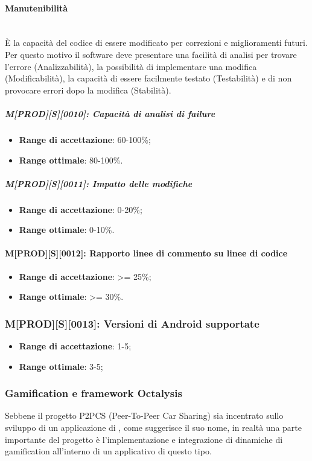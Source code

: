 \paragraph{Manutenibilità}
~\\
È la capacità del codice di essere modificato per correzioni e miglioramenti futuri. Per questo motivo il software deve presentare una facilità di analisi per trovare l'errore (Analizzabilità), la possibilità di implementare una modifica (Modificabilità), la capacità di essere facilmente testato (Testabilità) e di non provocare errori dopo la modifica (Stabilità).
\subparagraph{M[PROD][S][0010]: Capacità di analisi di failure}
\begin{itemize}
    \item \textbf{Range di accettazione}: 60-100\%;
    \item \textbf{Range ottimale}: 80-100\%.
\end{itemize}
\subparagraph{M[PROD][S][0011]: Impatto delle modifiche}
\begin{itemize}
    \item \textbf{Range di accettazione}: 0-20\%;
    \item \textbf{Range ottimale}: 0-10\%.
\end{itemize}

\paragraph{M[PROD][S][0012]: Rapporto linee di commento su linee di codice}
\begin{itemize}
    \item \textbf{Range di accettazione}: >= 25\%;
    \item \textbf{Range ottimale}: >= 30\%.
\end{itemize}

\subsubsection{M[PROD][S][0013]: Versioni di Android supportate}
\begin{itemize}
    \item \textbf{Range di accettazione}: 1-5;
    \item \textbf{Range ottimale}: 3-5;
\end{itemize}
\subsubsection{Gamification e framework Octalysis}
Sebbene il progetto P2PCS (Peer-To-Peer Car Sharing) sia incentrato sullo sviluppo di un applicazione  di , come suggerisce il suo nome, in realtà una parte importante del progetto è l'implementazione e integrazione di dinamiche di gamification all'interno di un applicativo di questo tipo.
